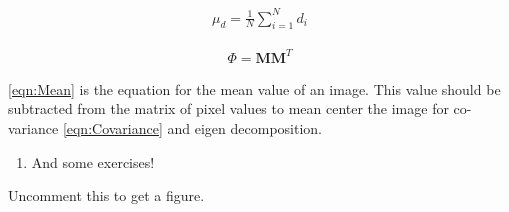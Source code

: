 \documentclass{tufte-handout}
\newcommand{\x}{\mathbf{x}}
\begin{document}
\begin{align}
 \mu_{d} = \frac{1}{N} \sum_{i=1}^{N} d_{i} \label{eqn:Mean}
\end{align}

\begin{align}
\Phi = \mathbf{MM}^{T} \label{eqn:Covariance}
\end{align}

\eqref{eqn:Mean} is the equation for the mean value of an image. This value should be subtracted from the matrix of pixel values to mean center the image for co-variance \eqref{eqn:Covariance} and eigen decomposition.  




\begin{enumerate}[resume]
\item And some exercises!
\end{enumerate}




Uncomment this to get a figure.


\end{document}

